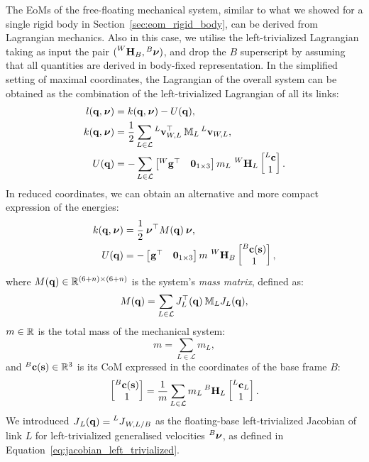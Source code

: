 The \acp{EoM} of the free-floating mechanical system, similar to what we showed for a single rigid body in Section~\ref{sec:eom_rigid_body}, can be derived from Lagrangian mechanics.
Also in this case, we utilise the left-trivialized Lagrangian taking as input the pair $(\homo[W]_B, \Nu[B])$, and drop the $B$ superscript by assuming that all quantities are derived in body-fixed representation.
In the simplified setting of maximal coordinates, the Lagrangian of the overall system can be obtained as the combination of the left-trivialized Lagrangian of all its links:
%
\begin{align*}
    l(\Qu, \Nu) &= k(\Qu, \Nu) - U(\Qu), \\
    k(\Qu, \Nu) &= \frac{1}{2} \sum_{L \in \mathcal{L}} \velsix[L]_{W,L}^\top \masssix_L \velsix[L]_{W,L}, \\
    U(\Qu) &= - \sum_{L \in \mathcal{L}} \begin{bmatrix}\gravity[W]^\top & \zeros_{1\times3}\end{bmatrix}
    m_L \, \homo[W]_L
    \begin{bmatrix} {}^L\mathbf{c} \\ 1 \end{bmatrix}
    .
\end{align*}
%
In reduced coordinates, we can obtain an alternative and more compact expression of the energies:
%
\begin{align*}
    k(\Qu, \Nu) &= \frac{1}{2} \Nu^\top M(\Qu) \Nu, \\
    U(\Qu) &= -\begin{bmatrix}\gravity^\top & \zeros_{1\times3}\end{bmatrix}
    m \, \homo[W]_B
    \begin{bmatrix}{}^B\mathbf{c}(\Shape) \\ 1 \end{bmatrix}
    ,
\end{align*}
%
where $M(\Qu) \in \realn^{(6+n)\times(6+n)}$ is the system's \emph{mass matrix}, defined as:
%
\begin{equation}
    \label{eq:mass_matrix}
    M(\Qu) = \sum_{L\in\mathcal{L}} J_L^\top(\Qu) \masssix_L J_L(\Qu),
\end{equation}
%
$m \in \realn$ is the total mass of the mechanical system:
%
\begin{equation*}
    m = \sum_{L\in\mathcal{L}} m_L
    ,
\end{equation*}
%
and ${}^B\mathbf{c}(\Shape) \in \realn^3$ is its \ac{CoM} expressed in the coordinates of the base frame $B$:
%
\begin{equation*}
    \begin{bmatrix}{}^B\mathbf{c}(\Shape) \\ 1\end{bmatrix} =
    \frac{1}{m} \sum_{L\in\mathcal{L}} m_L \homo[B]_L \begin{bmatrix}{}^L\mathbf{c}_L\\1\end{bmatrix}
    .
\end{equation*}
%
We introduced $\jac_L(\Qu) = \jac[L]_{W,L/B}$ as the floating-base left-trivialized Jacobian of link $L$ for left-trivialized generalised velocities $\Nu[B]$, as defined in Equation~\eqref{eq:jacobian_left_trivialized}.

